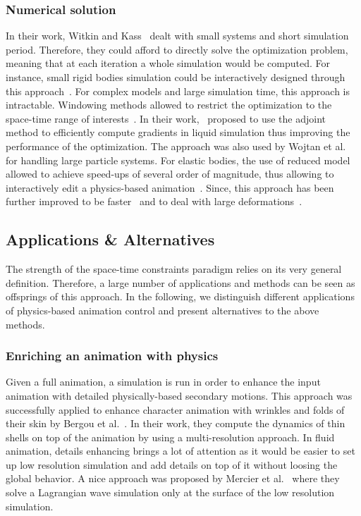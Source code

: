 \subsubsection{Numerical solution}
In their work, Witkin and Kass~\cite{Witkin1988} dealt with small systems and short simulation period.
Therefore, they could afford to directly solve the optimization problem, meaning that at each iteration a whole simulation would be computed. For instance, small rigid bodies simulation could be interactively designed through this approach~\cite{Popovic2000,Popovic2003}. For complex models and large simulation time, this approach is intractable. Windowing methods allowed to restrict the optimization to the space-time range of interests~\cite{Cohen1992}. In their work,~\cite{McNamara2004} proposed to use the adjoint method to efficiently compute gradients in liquid simulation thus improving the performance of the optimization. The approach was also used by Wojtan et al.~\cite{wojtan2006keyframe} for handling large particle systems. For elastic bodies, the use of reduced model allowed to achieve speed-ups of several order of magnitude, thus allowing to interactively edit a physics-based animation~\cite{Barbic2012,Hildebrandt2012,Hahn2012}. Since, this approach has been further improved to be faster~\cite{Schulz2014} and to deal with large deformations~\cite{Li2014}.

\subsection{Applications \& Alternatives}
The strength of the space-time constraints paradigm relies on its very general definition. Therefore, a large number of applications and methods can be seen as offsprings of this approach. In the following, we distinguish different applications of physics-based animation control and present alternatives to the above methods.

\subsubsection{Enriching an animation with physics}
Given a full animation, a simulation is run in order to enhance the input animation with detailed physically-based secondary motions. This approach was successfully applied to enhance character animation with wrinkles and folds of their skin by Bergou et al.~\cite{Bergou2007}. In their work, they compute the dynamics of thin shells on top of the animation by using a multi-resolution approach. In fluid animation, details enhancing brings a lot of attention as it would be easier to set up low resolution simulation and add details on top of it without loosing the global behavior. A nice approach was proposed by Mercier et al.~\cite{Mercier2015} where they solve a Lagrangian wave simulation only at the surface of the low resolution simulation.

